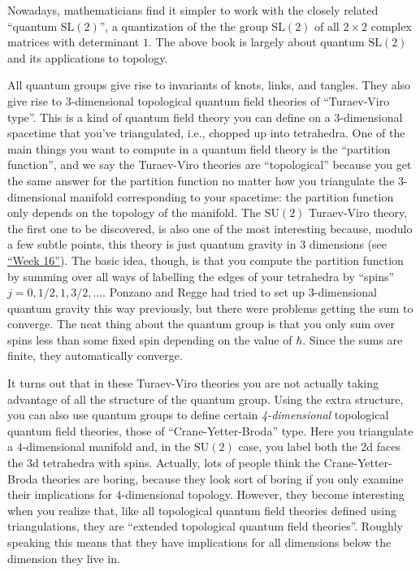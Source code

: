 \documentclass{article}
\begin{document}
Nowadays, mathematicians find it simpler to work with the closely
related ``quantum \(\mathrm{SL}(2)\)'', a quantization of the the group
\(\mathrm{SL}(2)\) of all \(2\times2\) complex matrices with determinant
\(1\). The above book is largely about quantum \(\mathrm{SL}(2)\) and
its applications to topology.

All quantum groups give rise to invariants of knots, links, and tangles.
They also give rise to \(3\)-dimensional topological quantum field
theories of ``Turaev-Viro type''. This is a kind of quantum field theory
you can define on a \(3\)-dimensional spacetime that you've
triangulated, i.e., chopped up into tetrahedra. One of the main things
you want to compute in a quantum field theory is the ``partition
function'', and we say the Turaev-Viro theories are ``topological''
because you get the same answer for the partition function no matter how
you triangulate the 3-dimensional manifold corresponding to your
spacetime: the partition function only depends on the topology of the
manifold. The \(\mathrm{SU}(2)\) Turaev-Viro theory, the first one to be
discovered, is also one of the most interesting because, modulo a few
subtle points, this theory is just quantum gravity in 3 dimensions (see
\protect\hyperlink{week16}{``Week 16''}). The basic idea, though, is
that you compute the partition function by summing over all ways of
labelling the edges of your tetrahedra by ``spins''
\(j = 0, 1/2, 1, 3/2,\ldots\). Ponzano and Regge had tried to set up
\(3\)-dimensional quantum gravity this way previously, but there were
problems getting the sum to converge. The neat thing about the quantum
group is that you only sum over spins less than some fixed spin
depending on the value of \(\hbar\). Since the sums are finite, they
automatically converge.

It turns out that in these Turaev-Viro theories you are not actually
taking advantage of all the structure of the quantum group. Using the
extra structure, you can also use quantum groups to define certain
\emph{4-dimensional} topological quantum field theories, those of
``Crane-Yetter-Broda'' type. Here you triangulate a \(4\)-dimensional
manifold and, in the \(\mathrm{SU}(2)\) case, you label both the 2d
faces the 3d tetrahedra with spins. Actually, lots of people think the
Crane-Yetter-Broda theories are boring, because they look sort of boring
if you only examine their implications for \(4\)-dimensional topology.
However, they become interesting when you realize that, like all
topological quantum field theories defined using triangulations, they
are ``extended topological quantum field theories''. Roughly speaking
this means that they have implications for all dimensions below the
dimension they live in.
\end{document}
